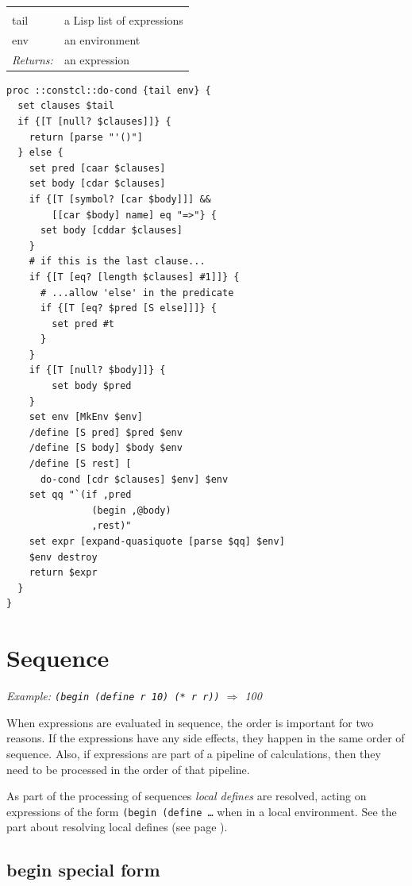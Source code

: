 \documentclass[twoside,9pt]{report}
\begin{document}
\noindent\begin{tabular}{ |p{1.9cm} p{8cm}| }
\hline
\rowcolor[HTML]{CCCCCC} \multicolumn{2}{|l|}{\bf do-cond (internal)} \\
tail & a Lisp list of expressions \\
env & an environment \\
\textit{Returns:} & an expression \\
\hline
\end{tabular}
\begin{lstlisting}
proc ::constcl::do-cond {tail env} {
  set clauses $tail
  if {[T [null? $clauses]]} {
    return [parse "'()"]
  } else {
    set pred [caar $clauses]
    set body [cdar $clauses]
    if {[T [symbol? [car $body]]] &&
        [[car $body] name] eq "=>"} {
      set body [cddar $clauses]
    }
    # if this is the last clause...
    if {[T [eq? [length $clauses] #1]]} {
      # ...allow 'else' in the predicate
      if {[T [eq? $pred [S else]]]} {
        set pred #t
      }
    }
    if {[T [null? $body]]} {
        set body $pred
    }
    set env [MkEnv $env]
    /define [S pred] $pred $env
    /define [S body] $body $env
    /define [S rest] [
      do-cond [cdr $clauses] $env] $env
    set qq "`(if ,pred
               (begin ,@body)
               ,rest)"
    set expr [expand-quasiquote [parse $qq] $env]
    $env destroy
    return $expr
  }
}
\end{lstlisting}
\section{Sequence}
\label{sequence}


\emph{Example: \texttt{(begin (define r 10) (* r r))} $\Rightarrow$ 100}


When expressions are evaluated in sequence, the order is important for two reasons. If the expressions have any side effects, they happen in the same order of sequence. Also, if expressions are part of a pipeline of calculations, then they need to be processed in the order of that pipeline.


As part of the processing of sequences \emph{local defines} are resolved, acting on expressions of the form \texttt{(begin (define \ldots } when in a local environment. See the part about resolving local defines (see page \pageref{resolving-local-defines}).

\subsection{begin special form}
\label{begin-special-form}
\end{document}
